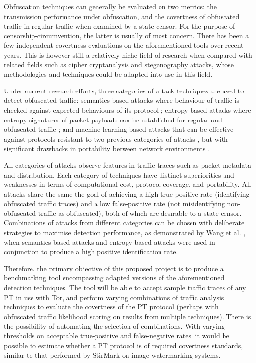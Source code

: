 \documentclass[11pt]{article}
\begin{document}
Obfuscation techniques can generally be evaluated on two metrics: the transmission performance under obfuscation, and the covertness of obfuscated traffic in regular traffic when examined by a state censor. For the purpose of censorship-circumvention, the latter is usually of most concern. There has been a few independent covertness evaluations on the aforementioned tools \cite{tan2015towards} \cite{houmansadr2013parrot} \cite{wang2015seeing} over recent years. This is however still a relatively niche field of research when compared with related fields such as cipher cryptanalysis and steganography attacks, whose methodologies and techniques could be adapted into use in this field.

Under current research efforts, three categories of attack techniques are used to detect obfuscated traffic: semantics-based attacks where behaviour of traffic is checked against expected behaviours of its protocol \cite[Sec. VIII]{houmansadr2013parrot} \cite[Sec. 4]{wang2015seeing}; entropy-based attacks where entropy signatures of packet payloads can be established for regular and obfuscated traffic \cite{tan2015towards} \cite[Sec. 5]{wang2015seeing}; and machine learning-based attacks that can be effective against protocols resistant to two previous categories of attacks \cite[Sec. 6]{wang2015seeing}, but with significant drawbacks in portability between network environments \cite{dixon2016network}. 

All categories of attacks observe features in traffic traces such as packet metadata and distribution. Each category of techniques have distinct superiorities and weaknesses in terms of computational cost, protocol coverage, and portability. All attacks share the same the goal of achieving a high true-positive rate (identifying obfuscated traffic traces) and a low false-positive rate (not misidentifying non-obfuscated traffic as obfuscated), both of which are desirable to a state censor. Combinations of attacks from different categories can be chosen with deliberate strategies to maximise detection performance, as demonstrated by Wang et al. \cite[Sec. 5.2]{wang2015seeing}, when semantics-based attacks and entropy-based attacks were used in conjunction to produce a high positive identification rate.

Therefore, the primary objective of this proposed project is to produce a benchmarking tool encompassing adapted versions of the aforementioned detection techniques. The tool will be able to accept sample traffic traces of any PT in use with Tor, and perform varying combinations of traffic analysis techniques to evaluate the covertness of the PT protocol (perhaps with obfuscated traffic likelihood scoring on results from multiple techniques). There is the possibility of automating the selection of combinations. With varying thresholds on acceptable true-positive and false-negative rates, it would be possible to estimate whether a PT protocol is of required covertness standards, similar to that performed by StirMark \cite{petitcolas1998attacks} on image-watermarking systems.
\end{document}
